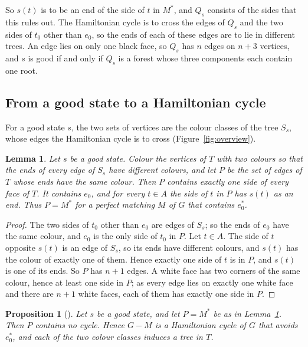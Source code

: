 \documentclass[a4paper]{amsart}
\numberwithin{equation}{section}
\newtheorem{proposition}[equation]{Proposition}
\newtheorem{lemma}[equation]{Lemma}
\theoremstyle{definition}
\begin{document}
So $s(t)$ is to be an end of the side of $t$ in $M^*$, and $Q_s$ consists of the sides that this rules out.
The Hamiltonian cycle is to cross the edges of $Q_s$ and the two sides of $t_0$ other than $e_0$, so the ends of each of these edges are to lie in different trees.
An edge lies on only one black face, so $Q_s$ has $n$ edges on $n+3$ vertices, and $s$ is good if and only if $Q_s$ is a forest whose three components each contain one root.

\subsection*{From a good state to a Hamiltonian cycle}
For a good state $s$, the two sets of vertices are the colour classes of the tree $S_s$, whose edges the Hamiltonian cycle is to cross (Figure~\ref{fig:overview}).

\begin{lemma}\label{lem:matching}
Let $s$ be a good state.
Colour the vertices of $T$ with two colours so that the ends of every edge of $S_s$ have different colours, and let $P$ be the set of edges of $T$ whose ends have the same colour.
Then $P$ contains exactly one side of every face of $T$.
It contains $e_0$, and for every $t\in A$ the side of $t$ in $P$ has $s(t)$ as an end.
Thus $P=M^*$ for a perfect matching $M$ of $G$ that contains $e_0^*$.
\end{lemma}

\begin{proof}
The two sides of $t_0$ other than $e_0$ are edges of $S_s$; so the ends of $e_0$ have the same colour, and $e_0$ is the only side of $t_0$ in $P$.
Let $t\in A$.
The side of $t$ opposite $s(t)$ is an edge of $S_s$, so its ends have different colours, and $s(t)$ has the colour of exactly one of them.
Hence exactly one side of $t$ is in $P$, and $s(t)$ is one of its ends.
So $P$ has $n+1$ edges.
A white face has two corners of the same colour, hence at least one side in $P$; as every edge lies on exactly one white face and there are $n+1$ white faces, each of them has exactly one side in $P$.
\end{proof}

\begin{proposition}[{\cite[Section~6]{OpenAI}}]\label{prop:recover}
Let $s$ be a good state, and let $P=M^*$ be as in Lemma~\ref{lem:matching}.
Then $P$ contains no cycle.
Hence $G-M$ is a Hamiltonian cycle of $G$ that avoids $e_0^*$, and each of the two colour classes induces a tree in $T$.
\end{proposition}
\end{document}
